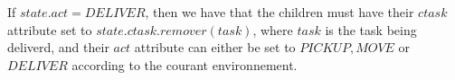 \documentclass[11pt]{article}
\begin{document}
If $state.act = DELIVER$, then we have that the children must have their $ctask$ attribute set to $state.ctask.remover(task)$, where $task$ is the task being deliverd, and their $act$ attribute can either be set to $PICKUP, MOVE$ or $DELIVER$ according to the courant environnement.\\
		
\end{document}
